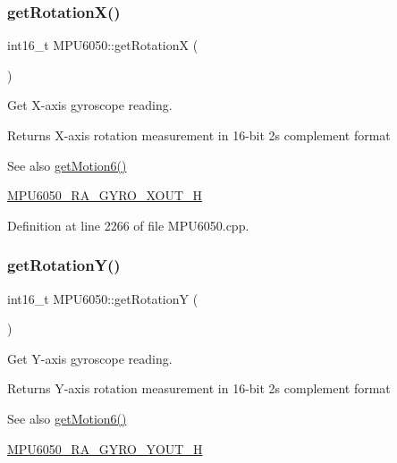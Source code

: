 \subsubsection{\texorpdfstring{getRotationX()}{getRotationX()}}
{\footnotesize\ttfamily int16\+\_\+t M\+P\+U6050\+::get\+RotationX (\begin{DoxyParamCaption}{ }\end{DoxyParamCaption})}

Get X-\/axis gyroscope reading. \begin{DoxyReturn}{Returns}
X-\/axis rotation measurement in 16-\/bit 2\textquotesingle{}s complement format 
\end{DoxyReturn}
\begin{DoxySeeAlso}{See also}
\mbox{\hyperlink{classMPU6050_a574d3093dc131e4251a9b37adf208ca7}{get\+Motion6()}} 

\mbox{\hyperlink{MPU6050_8h_abf19d88e8e460df1c49750393ee4b72c}{M\+P\+U6050\+\_\+\+R\+A\+\_\+\+G\+Y\+R\+O\+\_\+\+X\+O\+U\+T\+\_\+H}} 
\end{DoxySeeAlso}


Definition at line 2266 of file M\+P\+U6050.\+cpp.


\begin{DoxyCode}{0}

\end{DoxyCode}
\mbox{\label{classMPU6050_a97cbe7f10dd27e07bd78d1c25e4286b5}} 
\subsubsection{\texorpdfstring{getRotationY()}{getRotationY()}}
{\footnotesize\ttfamily int16\+\_\+t M\+P\+U6050\+::get\+RotationY (\begin{DoxyParamCaption}{ }\end{DoxyParamCaption})}

Get Y-\/axis gyroscope reading. \begin{DoxyReturn}{Returns}
Y-\/axis rotation measurement in 16-\/bit 2\textquotesingle{}s complement format 
\end{DoxyReturn}
\begin{DoxySeeAlso}{See also}
\mbox{\hyperlink{classMPU6050_a574d3093dc131e4251a9b37adf208ca7}{get\+Motion6()}} 

\mbox{\hyperlink{MPU6050_8h_a97729ffd27bd81b9af5b42a598f91736}{M\+P\+U6050\+\_\+\+R\+A\+\_\+\+G\+Y\+R\+O\+\_\+\+Y\+O\+U\+T\+\_\+H}} 
\end{DoxySeeAlso}


